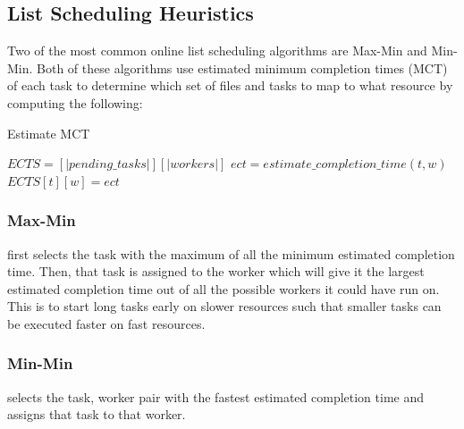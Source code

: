 \subsection*{List Scheduling Heuristics}

Two of the most common online list scheduling algorithms are Max-Min and Min-Min.
Both of these algorithms use estimated minimum completion times (MCT) of each
task to determine which set of files and tasks to map to what resource by
computing the following:

\begin{algorithm}[H]
  \renewcommand{\thealgorithm}{}
  \caption{Estimate MCT}
  \begin{algorithmic}
    \STATE $ECTS = [|pending\_tasks|][|workers|]$
        \STATE $ect = estimate\_completion\_time(t, w)$
        \STATE $ECTS[t][w] = ect$
      \ENDFOR
    \ENDFOR
  \end{algorithmic}
\end{algorithm}

\subsubsection*{Max-Min}
first selects the task with the maximum of all the minimum estimated completion time.
Then, that task is assigned to the worker which will give it the largest estimated
completion
time out of all the possible workers it could have run on. This is to start long
tasks early on slower resources such that smaller tasks can be executed faster
on fast resources.

\subsubsection*{Min-Min}
selects the task, worker pair with the fastest estimated completion time and
assigns that task to that worker.
